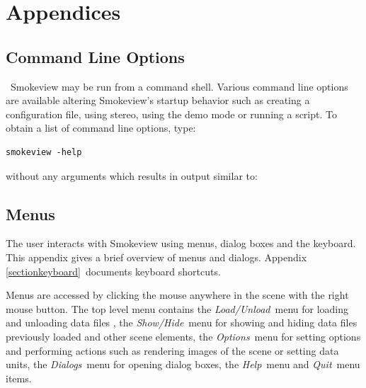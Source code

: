 \documentclass[11pt,twoside]{book}
\begin{document}


\part{Appendices}
\appendix
{}


\chapter{Command Line Options}
\label{sectioncommand}\ Smokeview may be run from a command shell.
Various command line options are available altering Smokeview's
startup behavior such as creating a configuration file, using
stereo, using the demo mode or running a script. To obtain a list
of command line options, type:
\begin{lstlisting}
smokeview -help
\end{lstlisting}
\noindent without any arguments which results in output similar to:\\




\chapter{Menus}
\label{sectionmenu}

The user interacts with
Smokeview using menus, dialog boxes and the keyboard.
This appendix gives a brief overview of menus and dialogs.
Appendix \ref{sectionkeyboard}\ documents keyboard shortcuts.

Menus are accessed by clicking the mouse anywhere in the scene with the right mouse button.
The top level menu contains the {\em Load/Unload}\ menu for loading
and unloading data files , the {\em Show/Hide}\ menu for showing and
hiding data files previously loaded and other scene elements, the {\em Options}\ menu
for setting options and performing actions such as rendering images of the scene or setting data units, the {\em Dialogs}\ menu for opening dialog boxes,
the {\em Help}\ menu and {\em Quit}\ menu items.
\end{document}
